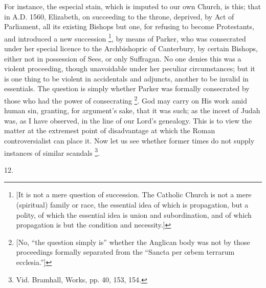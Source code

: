 For instance, the especial stain, which is imputed to our own
Church, is this; that in A.D. 1560, Elizabeth,
on succeeding to the throne, deprived, by Act of Parliament, all its
existing Bishops but one, for refusing to become Protestants, and
introduced a new succession \footnote{[It is not a mere question of succession.
The Catholic Church is not a mere (spiritual) family or race, the
essential idea of which is propagation, but a polity, of which the
essential idea is union and subordination, and of which propagation is
but the condition and necessity.]},
by means of Parker, who was consecrated under her special licence to
the Archbishopric of Canterbury, by certain Bishops, either not in
possession of Sees, or only Suffragan. No one denies this was a
violent proceeding, though unavoidable under her peculiar
circumstances; but it is one thing to be violent in accidentals and
adjuncts, another to be invalid in essentials. The question is simply
whether Parker was formally consecrated by those who had the power of
consecrating \footnote{[No, ``the question simply is''
whether the Anglican body was not by those proceedings formally
separated from the ``Sancta per orbem terrarum ecclesia.'']}. God may
carry on His work amid human sin, granting, for argument's sake, that
it was such; as the incest of Judah was, as I have observed, in the
line of our Lord's genealogy. This is to view the matter at the
extremest point of disadvantage at which the Roman controversialist
can place it. Now let us see whether former times do not supply
instances of similar scandals \footnote{Vid. Bramhall, Works, pp. 40, 153, 154.}.

12.

